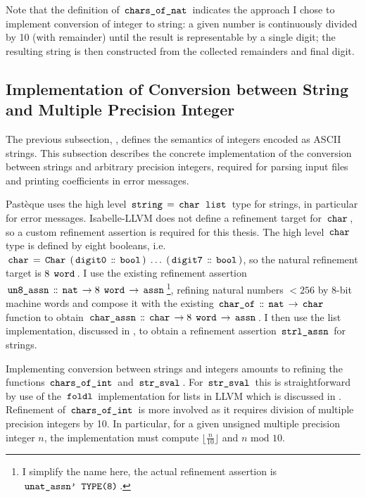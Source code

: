 Note that the definition of $\,\text{\ttfamily chars\_of\_nat}\,$ indicates the approach I chose to implement conversion of integer to string: a given number is continuously divided by 10 (with remainder) until the result is representable by a single digit; the resulting string is then constructed from the collected remainders and final digit.

\subsection{Implementation of Conversion between String and Multiple Precision Integer}\label{sec:conversion-between-string-and-integer}
The previous subsection, , defines the semantics of integers encoded as ASCII strings.
This subsection describes the concrete implementation of the conversion between strings and arbitrary precision integers, required for parsing input files and printing coefficients in error messages.

Pastèque uses the high level $\,\text{\ttfamily string}\, = \,\text{\ttfamily char}\, \; \,\text{\ttfamily list}\,$ type for strings, in particular for error messages.
Isabelle-LLVM does not define a refinement target for $\,\text{\ttfamily char}\,$, so a custom refinement assertion is required for this thesis.
The high level $\,\text{\ttfamily char}\,$ type is defined by eight booleans, i.e. $\,\text{\ttfamily char}\, = \,\text{\ttfamily Char}\, \; (\,\text{\ttfamily digit0}\, \mathrel{\mathord{:}\mkern-1.2mu\mathord{:}} \,\text{\ttfamily bool}\,) \; \dots \; (\,\text{\ttfamily digit7}\, \mathrel{\mathord{:}\mkern-1.2mu\mathord{:}} \,\text{\ttfamily bool}\,)$, so the natural refinement target is $8 \; \,\text{\ttfamily word}\,$.
I use the existing refinement assertion $\,\text{\ttfamily un8\_assn}\, \mathrel{\mathord{:}\mkern-1.2mu\mathord{:}} \,\text{\ttfamily nat}\, \rightarrow 8 \; \,\text{\ttfamily word}\, \rightarrow \,\text{\ttfamily assn}\,$\footnote{I simplify the name here, the actual refinement assertion is $\,\text{\ttfamily unat\_assn' TYPE(8)}\,$.}, refining natural numbers $< 256$ by 8-bit machine words and compose it with the existing $\,\text{\ttfamily char\_of}\, \mathrel{\mathord{:}\mkern-1.2mu\mathord{:}} \,\text{\ttfamily nat}\, \rightarrow \,\text{\ttfamily char}\,$ function to obtain $\,\text{\ttfamily char\_assn}\, \mathrel{\mathord{:}\mkern-1.2mu\mathord{:}} \,\text{\ttfamily char}\, \rightarrow 8 \; \,\text{\ttfamily word}\, \rightarrow \,\text{\ttfamily assn}\,$.
I then use the list implementation, discussed in , to obtain a refinement assertion $\,\text{\ttfamily strl\_assn}\,$ for strings.

Implementing conversion between strings and integers amounts to refining the functions $\,\text{\ttfamily chars\_of\_int}\,$ and $\,\text{\ttfamily str\_sval}\,$.
For $\,\text{\ttfamily str\_sval}\,$ this is straightforward by use of the $\,\text{\ttfamily foldl}\,$ implementation for lists in LLVM which is discussed in .
Refinement of $\,\text{\ttfamily chars\_of\_int}\,$ is more involved as it requires division of multiple precision integers by 10.
In particular, for a given unsigned multiple precision integer $n$, the implementation must compute $\lfloor \frac{n}{10} \rfloor $ and $n \text{ mod } 10$.


